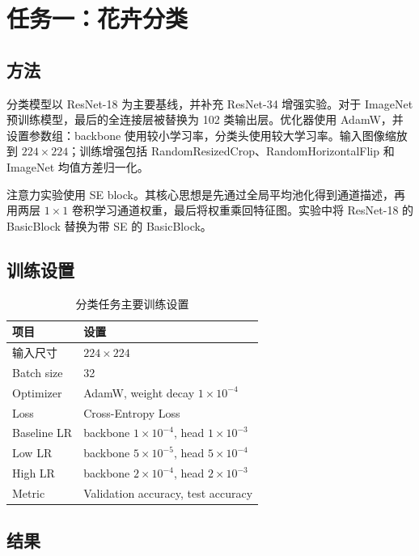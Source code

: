 \documentclass[UTF8,a4paper,11pt]{ctexart}
\begin{document}
\section{任务一：花卉分类}

\subsection{方法}

分类模型以 ResNet-18 为主要基线，并补充 ResNet-34 增强实验。对于 ImageNet 预训练模型，最后的全连接层被替换为 102 类输出层。优化器使用 AdamW，并设置参数组：backbone 使用较小学习率，分类头使用较大学习率。输入图像缩放到 $224 \times 224$；训练增强包括 RandomResizedCrop、RandomHorizontalFlip 和 ImageNet 均值方差归一化。

注意力实验使用 SE block。其核心思想是先通过全局平均池化得到通道描述，再用两层 $1 \times 1$ 卷积学习通道权重，最后将权重乘回特征图。实验中将 ResNet-18 的 BasicBlock 替换为带 SE 的 BasicBlock。

\subsection{训练设置}

\begin{table}[H]
\centering
\caption{分类任务主要训练设置}
\begin{tabular}{ll}
\toprule
项目 & 设置 \\
\midrule
输入尺寸 & $224 \times 224$ \\
Batch size & 32 \\
Optimizer & AdamW, weight decay $1\times10^{-4}$ \\
Loss & Cross-Entropy Loss \\
Baseline LR & backbone $1\times10^{-4}$, head $1\times10^{-3}$ \\
Low LR & backbone $5\times10^{-5}$, head $5\times10^{-4}$ \\
High LR & backbone $2\times10^{-4}$, head $2\times10^{-3}$ \\
Metric & Validation accuracy, test accuracy \\
\bottomrule
\end{tabular}
\end{table}

\subsection{结果}
\end{document}
